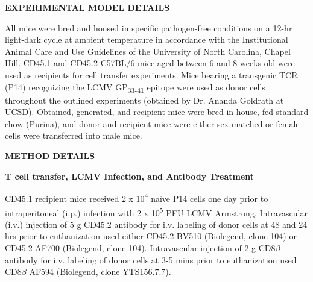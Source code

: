 %
\textbf{EXPERIMENTAL MODEL DETAILS}

All mice were bred and housed in specific pathogen-free conditions on a
12-hr light-dark cycle at ambient temperature in accordance with the
Institutional Animal Care and Use Guidelines of the University of North
Carolina, Chapel Hill. CD45.1 and CD45.2 C57BL/6 mice aged between 6 and
8 weeks old were used as recipients for cell transfer experiments. Mice
bearing a transgenic TCR (P14) recognizing the LCMV
GP\textsubscript{33-41} epitope were used as donor cells throughout the
outlined experiments (obtained by Dr. Ananda Goldrath at UCSD).
Obtained, generated, and recipient mice were bred in-house, fed standard
chow (Purina), and donor and recipient mice were either sex-matched or
female cells were transferred into male mice.

\textbf{METHOD DETAILS}

\textbf{T cell transfer, LCMV Infection, and Antibody Treatment}

CD45.1 recipient mice received 2 x 10\textsuperscript{4} naïve P14 cells
one day prior to intraperitoneal (i.p.) infection with 2 x
10\textsuperscript{5} PFU LCMV Armstrong. Intravascular (i.v.) injection
of 5 \textmu{}g CD45.2 antibody for i.v. labeling of donor cells at 48 and 24
hrs prior to euthanization used either CD45.2 BV510 (Biolegend, clone
104) or CD45.2 AF700 (Biolegend, clone 104). Intravascular injection of
2 \textmu{}g CD8$\beta$ antibody for i.v. labeling of donor cells at 3-5 mins prior to
euthanization used CD8$\beta$ AF594 (Biolegend, clone YTS156.7.7).


